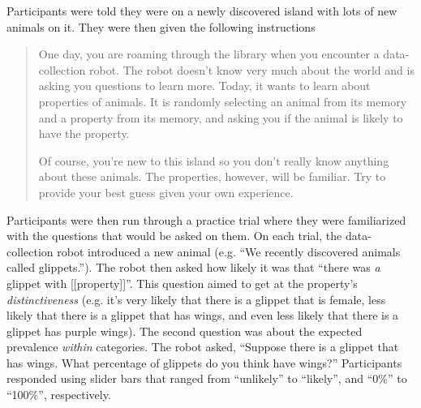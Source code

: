 \documentclass[10pt,letterpaper]{article}
\begin{document}
Participants were told they were on a newly discovered island with lots of new animals on it. They were then given the following instructions

\begin{quote}
One day, you are roaming through the library when you encounter a data-collection robot. The robot doesn't know very much about the world and is asking you questions to learn more. Today, it wants to learn about properties of animals. It is randomly selecting an animal from its memory and a property from its memory, and asking you if the animal is likely to have the property.

Of course, you're new to this island so you don't really know anything about these animals. The properties, however, will be familiar. Try to provide your best guess given your own experience.
\end{quote}

Participants were then run through a practice trial where they were familiarized with the questions that would be asked on them. 
On each trial, the data-collection robot introduced a new animal (e.g. ``We recently discovered animals called glippets.''). 
The robot then asked how likely it was that ``there was \emph{a} glippet with [[property]]''. 
This question aimed to get at the property's \emph{distinctiveness}
(e.g. it's very likely that there is a glippet that is female, less likely that there is a glippet that has wings, and even less likely that there is a glippet has purple wings). 
The second question was about the expected prevalence \emph{within} categories. 
The robot asked, ``Suppose there is a glippet that has wings. What percentage of glippets do you think have wings?'' Participants responded using slider bars that ranged from ``unlikely'' to ``likely'', and ``0\%'' to ``100\%'', respectively.

\end{document}

